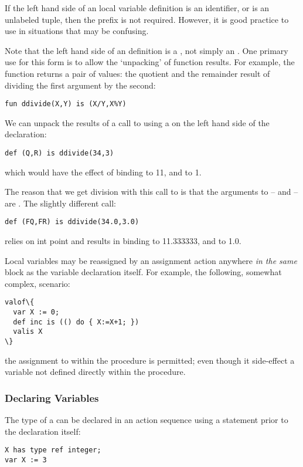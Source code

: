 If the left hand side of an  local variable definition is an identifier, or is an unlabeled tuple, then the  prefix is not required. However, it is good practice to use  in situations that may be confusing.

\begin{aside}
Note that the left hand side of an  definition is a , not simply an . One primary use for this form is to allow the `unpacking' of function results. For example, the function  returns a pair of values: the quotient and the remainder result of dividing the first argument by the second:
\begin{lstlisting}
fun ddivide(X,Y) is (X/Y,X%Y)
\end{lstlisting}
We can unpack the results of a call to  using a  on the left hand side of the declaration:
\begin{lstlisting}
def (Q,R) is ddivide(34,3)
\end{lstlisting}
which would have the effect of binding  to 11, and  to 1.
\begin{aside}
The reason that we get  division with this call to  is that the arguments to  --  and  -- are . The slightly different call:
\begin{lstlisting}
def (FQ,FR) is ddivide(34.0,3.0)
\end{lstlisting}
relies on int point  and results in binding  to 11.333333, and  to 1.0.
\end{aside}
\end{aside}

\begin{aside}
Local variables may be reassigned by an assignment action anywhere \emph{in the same} block as the variable declaration itself. For example, the following, somewhat complex, scenario:
\begin{lstlisting}
valof\{
  var X := 0;
  def inc is (() do { X:=X+1; })
  valis X
\}
\end{lstlisting}
the assignment to  within the  procedure is permitted; even though it  side-effect a variable not defined directly within the procedure.
\end{aside}

\subsubsection{Declaring Variables}
The type of a  can be declared in an action sequence using a  statement prior to the declaration itself:
\begin{lstlisting}
X has type ref integer;
var X := 3
\end{lstlisting}

